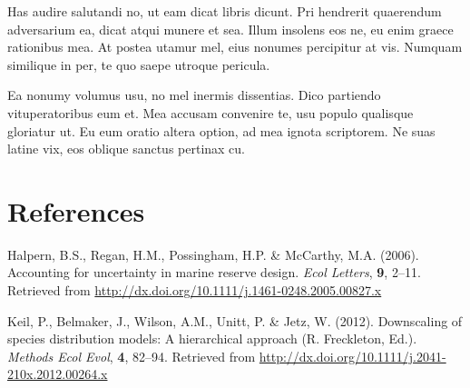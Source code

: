 \documentclass[]{article}
\begin{document}
Has audire salutandi no, ut eam dicat libris dicunt. Pri hendrerit
quaerendum adversarium ea, dicat atqui munere et sea. Illum insolens eos
ne, eu enim graece rationibus mea. At postea utamur mel, eius nonumes
percipitur at vis. Numquam similique in per, te quo saepe utroque
pericula.

Ea nonumy volumus usu, no mel inermis dissentias. Dico partiendo
vituperatoribus eum et. Mea accusam convenire te, usu populo qualisque
gloriatur ut. Eu eum oratio altera option, ad mea ignota scriptorem. Ne
suas latine vix, eos oblique sanctus pertinax cu.

\section*{References}\label{references}

Halpern, B.S., Regan, H.M., Possingham, H.P. \& McCarthy, M.A. (2006).
Accounting for uncertainty in marine reserve design. \emph{Ecol
Letters}, \textbf{9}, 2--11. Retrieved from
\url{http://dx.doi.org/10.1111/j.1461-0248.2005.00827.x}

Keil, P., Belmaker, J., Wilson, A.M., Unitt, P. \& Jetz, W. (2012).
Downscaling of species distribution models: A hierarchical approach (R.
Freckleton, Ed.). \emph{Methods Ecol Evol}, \textbf{4}, 82--94.
Retrieved from \url{http://dx.doi.org/10.1111/j.2041-210x.2012.00264.x}
\end{document}
